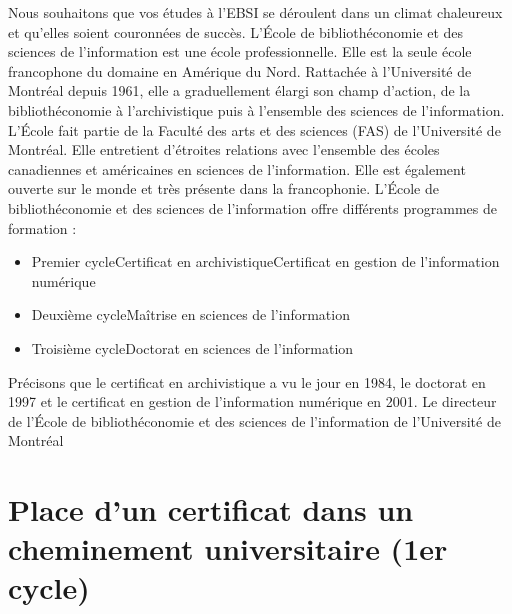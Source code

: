 \documentclass [12 pt]{article}
\begin{document}
            Nous souhaitons que vos études à l'EBSI se déroulent dans un climat chaleureux et
                qu'elles soient couronnées de succès.
            L'École de bibliothéconomie et des sciences de l'information est une école
                professionnelle. Elle est la seule école francophone du domaine en Amérique du Nord.
                Rattachée à l'Université de Montréal depuis 1961, elle a graduellement élargi son
                champ d'action, de la bibliothéconomie à l'archivistique puis à l'ensemble des
                sciences de l'information. L'École fait partie de la Faculté des arts et des
                sciences (FAS) de l'Université de Montréal. Elle entretient d'étroites relations
                avec l'ensemble des écoles canadiennes et américaines en sciences de l'information.
                Elle est également ouverte sur le monde et très présente dans la francophonie.
            L'École de bibliothéconomie et des sciences de l'information offre différents
                programmes de formation :
            
        \begin{itemize}
        
                
        \item Premier cycleCertificat en archivistiqueCertificat en gestion
                            de l'information numérique
                
        \item Deuxième cycleMaîtrise en sciences de l'information
                
        \item Troisième cycleDoctorat en sciences de l'information
            
        \end{itemize}
    
            Précisons que le certificat en archivistique a vu le jour en 1984, le doctorat en
                1997 et le certificat en gestion de l'information numérique en 2001.
            Le directeur de l'École de bibliothéconomie et des
                sciences de l'information de l'Université de Montréal
        
    
    
        \newpage
        \section {
        Place d'un certificat dans un cheminement universitaire (1er cycle)
        }
        
\end{document}

